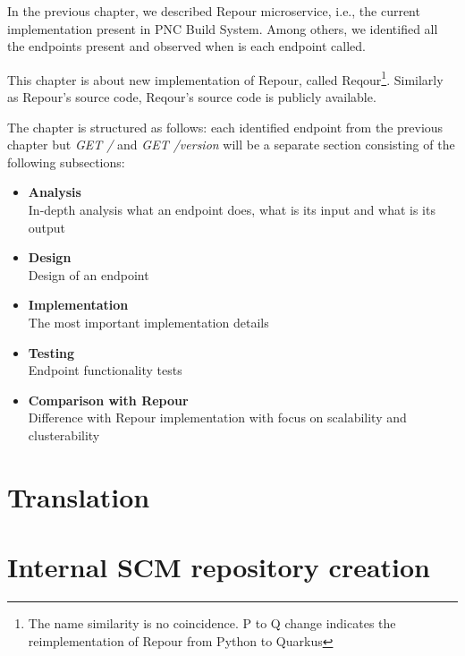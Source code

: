 \documentclass[../../main.tex]{subfiles}
\begin{document}
In the previous chapter, we described Repour microservice, i.e., the current implementation present in PNC Build System. Among others, we identified all the endpoints present and observed when is each endpoint called.

This chapter is about new implementation of Repour, called Reqour\footnote{The name similarity is no coincidence. P to Q change indicates the reimplementation of Repour from Python to Quarkus}. Similarly as Repour's source code, Reqour's source code is publicly available\cite{reqour}.

The chapter is structured as follows: each identified endpoint from the previous chapter but \textit{GET /} and \textit{GET /version} will be a separate section consisting of the following subsections:

\begin{itemize}
    \item \textbf{Analysis}\\
    In-depth analysis what an endpoint does, what is its input and what is its output

    \item \textbf{Design}\\
    Design of an endpoint

    \item \textbf{Implementation}\\
    The most important implementation details

    \item \textbf{Testing}\\
    Endpoint functionality tests

    \item \textbf{Comparison with Repour}\\
    Difference with Repour implementation with focus on scalability and clusterability
\end{itemize}


\section{Translation}


\section{Internal SCM repository creation}

\end{document}
